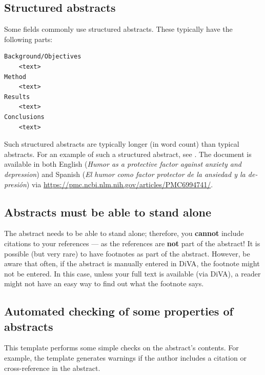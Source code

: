 \documentclass[12pt, twoside]{article}
\begin{document}
\subsection{Structured abstracts}
\label{sec:cycle3StructuredAbstracts}
Some fields commonly use structured abstracts. These typically have the following parts:
\begin{verbatim}
Background/Objectives
    <text>
Method
    <text>
Results
    <text>
Conclusions
    <text>
\end{verbatim}

Such structured abstracts are typically longer (in word count) than typical abstracts. For an example of such a structured abstract, see \cite{menendez-aller_humor_2020}.
The document is available in both English (\textit{Humor as a protective factor against anxiety and depression}) and Spanish (\textit{\foreignlanguage{spanish}{El humor como factor protector de la ansiedad y la depresión}}) via \url{https://pmc.ncbi.nlm.nih.gov/articles/PMC6994741/}.


\subsection{Abstracts must be able to stand alone}
\label{sec:cycle3standaloneAbstract}

The abstract needs to be able to stand alone; therefore, you \textbf{cannot} include citations to your references --- as the references are \textbf{not} part of the abstract! It is possible (but very rare) to have footnotes as part of the abstract. However, be aware that often, if the abstract is manually entered in \gls{DiVA}, the footnote might not be entered. In this case, unless your full text is available (\eg via \gls{DiVA}), a reader might not have an easy way to find out what the footnote says.

\subsection{Automated checking of some properties of abstracts}
\label{sec:cycle3AbstractChecking}
This template performs some simple checks on the abstract's contents. For example, the template generates warnings if the author includes a citation or cross-reference in the abstract.
\end{document}
